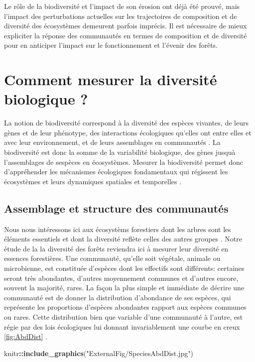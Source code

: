 \documentclass[
  11pt,
  french,
  A4paper,
  extrafontsizes,onecolumn,openright
  ]{memoir}
\newenvironment{Shaded}{\begin{snugshade}}{\end{snugshade}}
\newcommand{\KeywordTok}[1]{\textcolor[rgb]{0.13,0.29,0.53}{\textbf{#1}}}
\newcommand{\StringTok}[1]{\textcolor[rgb]{0.31,0.60,0.02}{#1}}
\newcommand{\OperatorTok}[1]{\textcolor[rgb]{0.81,0.36,0.00}{\textbf{#1}}}
\newcommand{\NormalTok}[1]{#1}
\begin{document}
Le rôle de la biodiversité et l'impact de son érosion ont déjà été
prouvé, mais l'impact des perturbations actuelles sur les trajectoires
de composition et de diversité des écosystèmes demeurent parfois
imprécis. Il est nécessaire de mieux expliciter la réponse des
communautés en termes de composition et de diversité pour en anticiper
l'impact sur le fonctionnement et l'évenir des forêts.

\section{Comment mesurer la diversité biologique
?}\label{comment-mesurer-la-diversite-biologique}

La notion de biodiversité correspond à la diversité des espèces
vivantes, de leurs gènes et de leur phénotype, des interactions
écologiques qu'elles ont entre elles et avec leur environnement, et de
leurs assemblages en communautés \autocite{Loreau2005}. La biodiversité
est donc la somme de la variabilité biologique, des gènes jusquà
l'assemblages de sespèces en écosystèmes. Mesurer la biodiversité permet
donc d'appréhender les mécanismes écologiques fondamentaux qui régissent
les écosystèmes et leurs dynamiques spatiales et temporelles
\autocites{Purvis2000}{Loreau2005}.

\subsection{Assemblage et structure des
communautés}\label{AbundanceDistribution}

Nous nous intéressons ici aux écosystèms forestiers dont les arbres sont
les éléments essentiels et dont la diversité reflète celles des autres
groupes \autocite{Guitet2017}. Notre étude de la la diversité des forêts
reviendra ici à mesurer leur diversité en essences forestières. Une
communauté, qu'elle soit végétale, animale ou microbienne, est
constituée d'espèces dont les effectifs sont différents: certaines
seront très abondantes, d'autres moyennement communes et d'autres
encore, souvent la majorité, rares. La façon la plus simple et immédiate
de décrire une communauté est de donner la distribution d'abondance de
ses espèces, qui représente les proportions d'espèces abondantes rapport
aux espèces communes ou rares. Cette distribution bien que variable
d'une communauté à l'autre, est régie par des lois écologiques lui
donnant invariablement une courbe en creux \ref{fig:AbdDist}
\autocite{McGill2007}.

\begin{Shaded}
\begin{Highlighting}[]
\NormalTok{knitr}\OperatorTok{::}\KeywordTok{include_graphics}\NormalTok{(}\StringTok{"ExternalFig/SpeciesAbdDist.jpg"}\NormalTok{)}
\end{Highlighting}
\end{Shaded}
\end{document}
